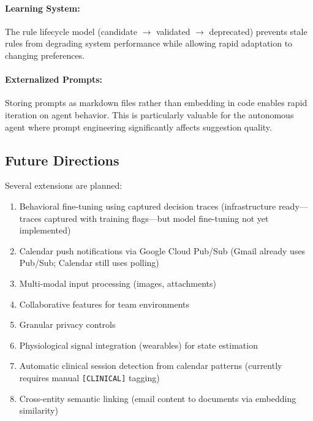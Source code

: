 \documentclass[11pt,a4paper]{article}
\begin{document}
\paragraph{Learning System:} The rule lifecycle model (candidate $\rightarrow$ validated $\rightarrow$ deprecated) prevents stale rules from degrading system performance while allowing rapid adaptation to changing preferences.

\paragraph{Externalized Prompts:} Storing prompts as markdown files rather than embedding in code enables rapid iteration on agent behavior. This is particularly valuable for the autonomous agent where prompt engineering significantly affects suggestion quality.

\subsection{Future Directions}

Several extensions are planned:
\begin{enumerate}
    \item Behavioral fine-tuning using captured decision traces (infrastructure ready---traces captured with training flags---but model fine-tuning not yet implemented)
    \item Calendar push notifications via Google Cloud Pub/Sub (Gmail already uses Pub/Sub; Calendar still uses polling)
    \item Multi-modal input processing (images, attachments)
    \item Collaborative features for team environments
    \item Granular privacy controls
    \item Physiological signal integration (wearables) for state estimation
    \item Automatic clinical session detection from calendar patterns (currently requires manual \texttt{[CLINICAL]} tagging)
    \item Cross-entity semantic linking (email content to documents via embedding similarity)
\end{enumerate}
\end{document}
